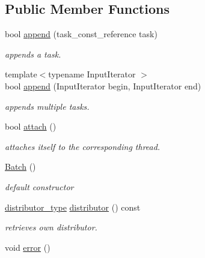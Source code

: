 \subsection*{Public Member Functions}
\begin{DoxyCompactItemize}
\item 
bool \hyperlink{group__task_gaef74f2d2dd44b8e13f615963ea1e1f0f}{append} (task\-\_\-const\-\_\-reference task)
\begin{DoxyCompactList}\small\item\em appends a task. \end{DoxyCompactList}\item 
{\footnotesize template$<$typename Input\-Iterator $>$ }\\bool \hyperlink{group__task_gabb7f26f7fde9cb631988f9cf906d499f}{append} (Input\-Iterator begin, Input\-Iterator end)
\begin{DoxyCompactList}\small\item\em appends multiple tasks. \end{DoxyCompactList}\item 
bool \hyperlink{classhryky_1_1task_1_1worker_1_1_base_ae17d5723d8aa5567ea6a47b67f8133c4}{attach} ()
\begin{DoxyCompactList}\small\item\em attaches itself to the corresponding thread. \end{DoxyCompactList}\item 
\hyperlink{group__task_ga1e0c51798108868eef5a4f126640b4d7}{Batch} ()
\begin{DoxyCompactList}\small\item\em default constructor \end{DoxyCompactList}\item 
\hyperlink{classhryky_1_1task_1_1distributor_1_1_batch}{distributor\-\_\-type} \hyperlink{classhryky_1_1task_1_1worker_1_1_batch_ae524443d01bdfe8db31bd6f01a983388}{distributor} () const 
\begin{DoxyCompactList}\small\item\em retrieves own distributor. \end{DoxyCompactList}\item 
\hypertarget{classhryky_1_1task_1_1worker_1_1_base_aa39b31ced492faec5dd3b6478b0a98df}{void \hyperlink{classhryky_1_1task_1_1worker_1_1_base_aa39b31ced492faec5dd3b6478b0a98df}{error} ()}\label{classhryky_1_1task_1_1worker_1_1_base_aa39b31ced492faec5dd3b6478b0a98df}


\end{DoxyCompactItemize}
